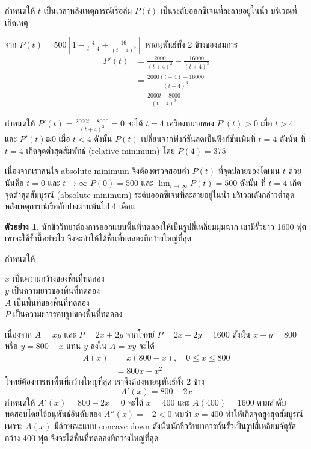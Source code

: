 \documentclass[
]{book}
\theoremstyle{definition}
\theoremstyle{definition}
\newtheorem{example}{ตัวอย่าง}[chapter]
\theoremstyle{definition}
\theoremstyle{definition}
\theoremstyle{remark}
\begin{document}
กำหนดให้ \(t\) เป็นเวลาหลังเหตุการณ์เรือล่ม \(P(t)\) เป็นระดับออกซิเจนที่ละลายอยู่ในน้ำ
บริเวณที่เกิดเหตุ

จาก \(P(t)=500[1- \frac{4}{t+4} + \frac{16}{(t+4)^2}]\) หาอนุพันธ์ทั้ง 2
ข้างของสมการ \begin{equation}   \begin{aligned}
    P'(t) &= \frac{2000}{(t+4)^2} - \frac{16000}{(t+4)^3} \\
          &=\frac{2000(t+4)-16000}{(t+4)^3} \\
          &=\frac{2000t-8000}{(t+4)^3}
  \end{aligned} \end{equation}

กำหนดให้ \(\displaystyle P'(t)= \frac{2000t-8000}{(t+4)^3}=0\) จะได้ \(t=4\)
เครื่องหมายของ \(P'(t) > 0\) เมื่อ \(t > 4\) และ \(P'(t) ฒ 0\) เมื่อ \(t < 4\) ดังนั้น
\(P(t)\) เปลี่ยนจากฟังก์ชันลดเป็นฟังก์ชันเพิ่มที่ \(t=4\) ดังนั้น ที่ \(t=4\) เกิดจุดต่ำสุดสัมพัทธ์
(relative minimum) โดย \(P(4)=375\)

เนื่องจากเราสนใจ absolute minimum จึงต้องตรวจสอบค่า \(P(t)\) ที่จุดปลายของโดเมน
\(t\) ด้วย นั่นคือ \(t = 0\) และ \(t \rightarrow \infty\) \(P(0)=500\) และ
\(\lim_{t \rightarrow \infty} P(t) = 500\) ดังนั้น ที่ \(t=4\) เกิดจุดต่ำสุดสัมบูรณ์
(absolute minimum) ระดับออกซิเจนที่ละลายอยู่ในน้ำ บริเวณดังกล่าวต่ำสุด
หลังเหตุการณ์เรืออับปางผ่านพ้นไป 4 เดือน

\begin{example}
นักชีววิทยาต้องการออกแบบพื้นที่ทดลองให้เป็นรูปสี่เหลี่ยมมุมฉาก เขามีรั้วยาว 1600 ฟุต
เขาจะใช้รั้วนี้อย่างไร จึงจะทำให้ได้พื้นที่ทดลองที่กว้างใหญ่ที่สุด
\end{example}

กำหนดให้

\(x\) เป็นความกว้างของพื้นที่ทดลอง\\
\(y\) เป็นความยาวของพื้นที่ทดลอง\\
\(A\) เป็นพื้นที่ของพื้นที่ทดลอง\\
\(P\) เป็นความยาวรอบรูปของพื้นที่ทดลอง

เนื่องจาก \(A=xy\) และ \(P=2x+2y\) จากโจทย์ \(P=2x+2y=1600\) ดังนั้น \(x+y=800\) หรือ
\(y=800-x\) แทน \(y\) ลงใน \(A=xy\) จะได้ \begin{equation}   \begin{aligned}
    A(x)  &=x(800-x), \quad  0 \le x \le 800 \\
            &=800x-x^2
  \end{aligned} \end{equation} โจทย์ต้องการหาพื้นที่กว้างใหญ่ที่สุด เราจึงต้องหาอนุพันธ์ทั้ง 2 ข้าง
\[A'(x)=800-2x\] กำหนดให้ \(A'(x)=800-2x=0\) จะได้ \(x=400\) และ \(A(400)=1600\)
ตามลำดับ ทดสอบโดยใช้อนุพันธ์อันดับสอง \(A''(x)=-2<0\) พบว่า \(x=400\)
ทำให้เกิดจุดสูงสุดสัมบูรณ์ เพราะ \(A(x)\) มีลักษณะแบบ concave down
ดังนั้นนักชีววิทยาควรกั้นรั้วเป็นรูปสี่เหลี่ยมจัตุรัสกว้าง 400 ฟุต จึงจะได้พื้นที่ทดลองที่กว้างใหญ่ที่สุด
\end{document}
